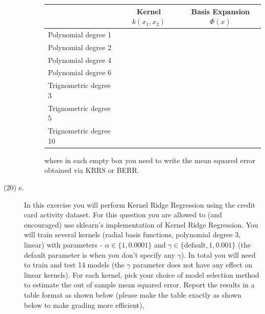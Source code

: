 \documentclass[11pt]{article}
\begin{document}
\begin{problem}{75}
\begin{description}
\begin{description}
\begin{table}[H]
\centering
\begin{tabular}{|l|c|c|}
\hline
                & Kernel $k(x_1, x_2)$ & Basis Expansion $\Phi(x)$ \\ \hline
Polynomial degree 1   &                      &                           \\ \hline
Polynomial degree 2   &                      &                           \\ \hline
Polynomial degree 4   &                      &                           \\ \hline
Polynomial degree 6   &                      &                           \\ \hline
Trignometric degree 3  &                      &                           \\ \hline
Trignometric degree 5  &                      &                           \\ \hline
Trignometric degree 10 &                      &                           \\ \hline
\end{tabular}
\end{table}
where in each empty box you need to write the mean squared error obtained via KRRS or BERR.

\end{description}

\item[(20) e.] In this exercise you will perform Kernel Ridge Regression using the credit card activity dataset.
For this question you are allowed to (and encouraged) use sklearn's implementation of Kernel Ridge Regression.
You will train several kernels (radial basis functions, polynomial degree 3, linear) with parameters - $\alpha \in \{1, 0.0001\}$ and $\gamma \in \{\text{default}, 1, 0.001\}$ (the default parameter is when you don't specify any $\gamma$).
In total you will need to train and test 14 models (the $\gamma$ parameter does not have any effect on linear kernels).
For each kernel, pick your choice of model selection method to estimate the out of sample mean squared error.
Report the results in a table format as shown below (please make the table exactly as shown below to make grading more efficient),


\end{description}
\end{problem}
\end{document}
